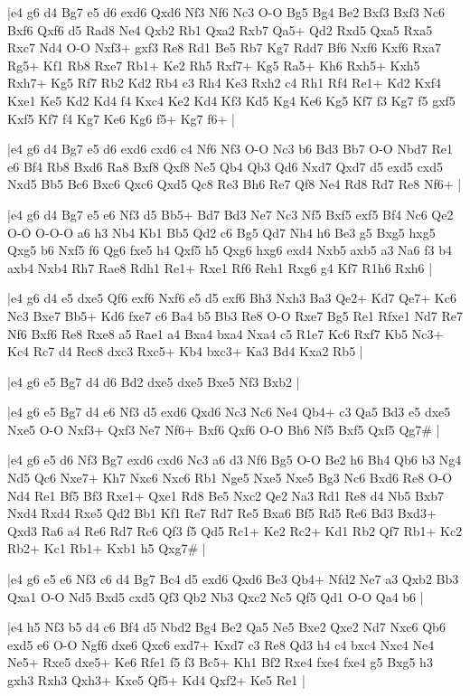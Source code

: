 \whitename{}
\blackname{}
\makegametitle
|e4 g6 d4 Bg7 e5 d6 exd6 Qxd6 Nf3 Nf6 Nc3 O-O Bg5 Bg4 Be2 Bxf3 Bxf3 Nc6 Bxf6 Qxf6 d5 Rad8 Ne4 Qxb2 Rb1 Qxa2 Rxb7 Qa5+ Qd2 Rxd5 Qxa5 Rxa5 Rxc7 Nd4 O-O Nxf3+ gxf3 Re8 Rd1 Be5 Rb7 Kg7 Rdd7 Bf6 Nxf6 Kxf6 Rxa7 Rg5+ Kf1 Rb8 Rxe7 Rb1+ Ke2 Rh5 Rxf7+ Kg5 Ra5+ Kh6 Rxh5+ Kxh5 Rxh7+ Kg5 Rf7 Rb2 Kd2 Rb4 c3 Rh4 Ke3 Rxh2 c4 Rh1 Rf4 Re1+ Kd2 Kxf4 Kxe1 Ke5 Kd2 Kd4 f4 Kxc4 Ke2 Kd4 Kf3 Kd5 Kg4 Ke6 Kg5 Kf7 f3 Kg7 f5 gxf5 Kxf5 Kf7 f4 Kg7 Ke6 Kg6 f5+ Kg7 f6+  |

\whitename{}
\blackname{}
\makegametitle
|e4 g6 d4 Bg7 e5 d6 exd6 cxd6 c4 Nf6 Nf3 O-O Nc3 b6 Bd3 Bb7 O-O Nbd7 Re1 e6 Bf4 Rb8 Bxd6 Ra8 Bxf8 Qxf8 Ne5 Qb4 Qb3 Qd6 Nxd7 Qxd7 d5 exd5 cxd5 Nxd5 Bb5 Bc6 Bxc6 Qxc6 Qxd5 Qc8 Re3 Bh6 Re7 Qf8 Ne4 Rd8 Rd7 Re8 Nf6+  |

\whitename{}
\blackname{}
\makegametitle
|e4 g6 d4 Bg7 e5 e6 Nf3 d5 Bb5+ Bd7 Bd3 Ne7 Nc3 Nf5 Bxf5 exf5 Bf4 Nc6 Qe2 O-O O-O-O a6 h3 Nb4 Kb1 Bb5 Qd2 c6 Bg5 Qd7 Nh4 h6 Be3 g5 Bxg5 hxg5 Qxg5 b6 Nxf5 f6 Qg6 fxe5 h4 Qxf5 h5 Qxg6 hxg6 exd4 Nxb5 axb5 a3 Na6 f3 b4 axb4 Nxb4 Rh7 Rae8 Rdh1 Re1+ Rxe1 Rf6 Reh1 Rxg6 g4 Kf7 R1h6 Rxh6  |

\whitename{}
\blackname{}
\makegametitle
|e4 g6 d4 e5 dxe5 Qf6 exf6 Nxf6 e5 d5 exf6 Bh3 Nxh3 Ba3 Qe2+ Kd7 Qe7+ Kc6 Nc3 Bxe7 Bb5+ Kd6 fxe7 c6 Ba4 b5 Bb3 Re8 O-O Rxe7 Bg5 Re1 Rfxe1 Nd7 Re7 Nf6 Bxf6 Re8 Rxe8 a5 Rae1 a4 Bxa4 bxa4 Nxa4 c5 R1e7 Kc6 Rxf7 Kb5 Nc3+ Kc4 Rc7 d4 Rec8 dxc3 Rxc5+ Kb4 bxc3+ Ka3 Bd4 Kxa2 Rb5  |

\whitename{}
\blackname{}
\makegametitle
|e4 g6 e5 Bg7 d4 d6 Bd2 dxe5 dxe5 Bxe5 Nf3 Bxb2  |

\whitename{}
\blackname{}
\makegametitle
|e4 g6 e5 Bg7 d4 e6 Nf3 d5 exd6 Qxd6 Nc3 Nc6 Ne4 Qb4+ c3 Qa5 Bd3 e5 dxe5 Nxe5 O-O Nxf3+ Qxf3 Ne7 Nf6+ Bxf6 Qxf6 O-O Bh6 Nf5 Bxf5 Qxf5 Qg7\#  |

\whitename{}
\blackname{}
\makegametitle
|e4 g6 e5 d6 Nf3 Bg7 exd6 cxd6 Nc3 a6 d3 Nf6 Bg5 O-O Be2 h6 Bh4 Qb6 b3 Ng4 Nd5 Qc6 Nxe7+ Kh7 Nxc6 Nxc6 Rb1 Nge5 Nxe5 Nxe5 Bg3 Nc6 Bxd6 Re8 O-O Nd4 Re1 Bf5 Bf3 Rxe1+ Qxe1 Rd8 Be5 Nxc2 Qe2 Na3 Rd1 Re8 d4 Nb5 Bxb7 Nxd4 Rxd4 Rxe5 Qd2 Bb1 Kf1 Re7 Rd7 Re5 Bxa6 Bf5 Rd5 Re6 Bd3 Bxd3+ Qxd3 Ra6 a4 Re6 Rd7 Rc6 Qf3 f5 Qd5 Rc1+ Ke2 Rc2+ Kd1 Rb2 Qf7 Rb1+ Kc2 Rb2+ Kc1 Rb1+ Kxb1 h5 Qxg7\#  |

\whitename{}
\blackname{}
\makegametitle
|e4 g6 e5 e6 Nf3 c6 d4 Bg7 Bc4 d5 exd6 Qxd6 Be3 Qb4+ Nfd2 Ne7 a3 Qxb2 Bb3 Qxa1 O-O Nd5 Bxd5 cxd5 Qf3 Qb2 Nb3 Qxc2 Nc5 Qf5 Qd1 O-O Qa4 b6  |

\whitename{}
\blackname{}
\makegametitle
|e4 h5 Nf3 b5 d4 c6 Bf4 d5 Nbd2 Bg4 Be2 Qa5 Ne5 Bxe2 Qxe2 Nd7 Nxc6 Qb6 exd5 e6 O-O Ngf6 dxe6 Qxc6 exd7+ Kxd7 c3 Re8 Qd3 h4 c4 bxc4 Nxc4 Ne4 Ne5+ Rxe5 dxe5+ Ke6 Rfe1 f5 f3 Bc5+ Kh1 Bf2 Rxe4 fxe4 fxe4 g5 Bxg5 h3 gxh3 Rxh3 Qxh3+ Kxe5 Qf5+ Kd4 Qxf2+ Ke5 Re1  |

